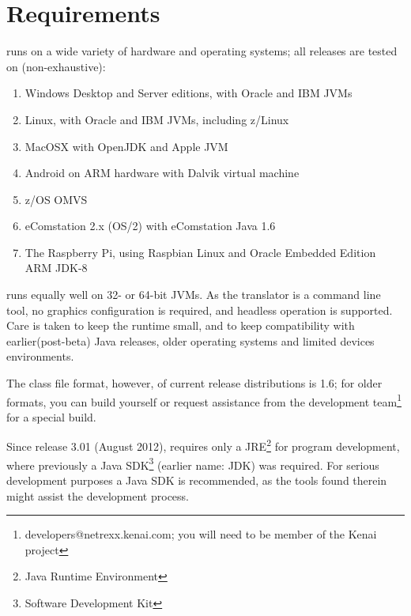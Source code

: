 \chapter{Requirements}
\nr{} \nrversion{} runs on a wide variety of
hardware and operating systems; all releases are tested on (non-exhaustive):
\begin{enumerate}
\item Windows Desktop and Server editions, with Oracle and IBM JVMs
\item Linux, with Oracle and IBM JVMs, including z/Linux
\item MacOSX with OpenJDK and Apple JVM
\item Android on ARM hardware with Dalvik virtual machine
\item z/OS OMVS
\item eComstation 2.x (OS/2) with eComstation Java 1.6
\item The Raspberry Pi, using Raspbian Linux and Oracle Embedded
  Edition ARM JDK-8
\end{enumerate}
\nr{} runs equally well on 32- or 64-bit JVMs. As the translator is
a command line tool, no graphics configuration is required, and
headless operation is supported. Care is taken to keep the \nr{} runtime small, and to keep
compatibility with earlier(post-beta) Java releases, older operating systems and
limited devices environments. 

The class file format, however, of
current release distributions is 1.6; for older formats, you
can build \nr{} yourself or request assistance from the development
team\footnote{developers@netrexx.kenai.com; you will
  need to be member of the Kenai \nr{} project} for a special build.

Since release 3.01 (August 2012), \nr{} requires only a
JRE\footnote{Java Runtime Environment} for program development, where previously a
Java SDK\footnote{Software Development Kit} (earlier name: JDK) was required. For serious development
purposes a Java SDK is recommended, as the tools found therein might
assist the development process.
